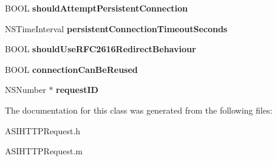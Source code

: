 \begin{DoxyCompactItemize}
\item 
\hypertarget{interface_a_s_i_h_t_t_p_request_ae51271a161a4b3bbba86b60ab991e1f8}{
BOOL {\bfseries shouldAttemptPersistentConnection}}
\label{interface_a_s_i_h_t_t_p_request_ae51271a161a4b3bbba86b60ab991e1f8}

\item 
\hypertarget{interface_a_s_i_h_t_t_p_request_a88a193e9b5c9dd228b2231f1988bf9af}{
NSTimeInterval {\bfseries persistentConnectionTimeoutSeconds}}
\label{interface_a_s_i_h_t_t_p_request_a88a193e9b5c9dd228b2231f1988bf9af}

\item 
\hypertarget{interface_a_s_i_h_t_t_p_request_a230f9a6925ada0e5f004bb94e3eb0186}{
BOOL {\bfseries shouldUseRFC2616RedirectBehaviour}}
\label{interface_a_s_i_h_t_t_p_request_a230f9a6925ada0e5f004bb94e3eb0186}

\item 
\hypertarget{interface_a_s_i_h_t_t_p_request_ae7896b2999f7f75f33351619ae4d961a}{
BOOL {\bfseries connectionCanBeReused}}
\label{interface_a_s_i_h_t_t_p_request_ae7896b2999f7f75f33351619ae4d961a}

\item 
\hypertarget{interface_a_s_i_h_t_t_p_request_a4932fe9248bd331e3aabe5bb4c5328bb}{
NSNumber $\ast$ {\bfseries requestID}}
\label{interface_a_s_i_h_t_t_p_request_a4932fe9248bd331e3aabe5bb4c5328bb}

\end{DoxyCompactItemize}


The documentation for this class was generated from the following files:\begin{DoxyCompactItemize}
\item 
ASIHTTPRequest.h\item 
ASIHTTPRequest.m\end{DoxyCompactItemize}
